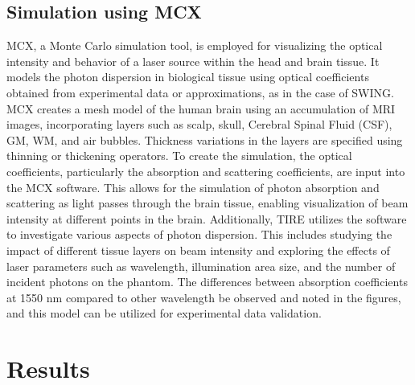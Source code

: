 \documentclass[journal,twoside,web]{ieeecolor}
\begin{document}

\subsection{Simulation using MCX}
MCX, a Monte Carlo simulation tool, is employed for visualizing the optical intensity and behavior of a laser source within the head and brain tissue. It models the photon dispersion in biological tissue using optical 
coefficients obtained from experimental data or approximations, as in the case of SWING. MCX creates a mesh model of the human brain using an accumulation of MRI images, incorporating layers such as scalp, skull, Cerebral Spinal Fluid (CSF), GM, WM, and air bubbles. Thickness variations in the layers are specified using thinning or thickening operators.
To create the simulation, the optical coefficients, particularly the absorption and scattering coefficients, are input into the MCX software. This allows for the simulation of photon absorption and scattering as light passes through the brain tissue, enabling visualization of beam intensity at different points in the brain.
Additionally, TIRE utilizes the software to investigate various aspects of photon dispersion. This includes studying the impact of different tissue layers on beam intensity and exploring the effects of laser parameters such as wavelength, illumination area size, and the number of incident photons on the phantom.  The differences between absorption coefficients at 1550 nm compared to other wavelength be observed and noted in the figures, and this model can be utilized for experimental data validation.



\section{Results}
\label{sec:results}
\end{document}
